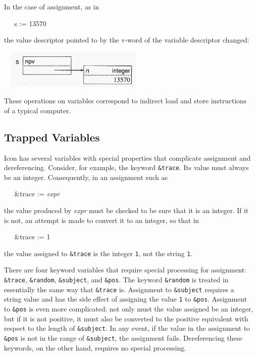 In the case of assignment, as in

{\ttfamily\mdseries
\ \ \ s := 13570}

\noindent the value descriptor pointed to by the v-word of the
variable descriptor changed:

\ \  \includegraphics[width=2.6717in,height=0.7374in]{ib-img/ib-img016.jpg} 

These operations on variables correspond to indirect load and store
instructions of a typical computer.

\subsection{Trapped Variables}

Icon has several variables with special properties that complicate
assignment and dereferencing. Consider, for example, the keyword
\texttt{\&trace}. Its value must always be an integer. Consequently,
in an assignment such as

{\ttfamily\mdseries
\ \ \ \&trace := \textit{expr}}

\noindent the value produced by \textit{expr} must be checked to be
sure that it is an integer. If it is not, an attempt is made to
convert it to an integer, so that in

{\ttfamily\mdseries
\ \ \ \&trace := {\textquotedbl}1{\textquotedbl}}

\noindent the value assigned to \texttt{\&trace} is the integer
\texttt{1}, not the string \texttt{{\textquotedbl}1{\textquotedbl}}.

There are four keyword variables that require special processing for
assignment: \texttt{\&trace}, \texttt{\&random}, \texttt{\&subject},
and \texttt{\&pos}. The keyword \texttt{\&random} is treated in
essentially the same way that \texttt{\&trace} is. Assignment to
\texttt{\&subject} requires a string value and has the side effect of
assigning the value \texttt{1} to \texttt{\&pos}. Assignment to
\texttt{\&pos} is even more complicated: not only must the value
assigned be an integer, but if it is not positive, it must also be
converted to the positive equivalent with respect to the length of
\texttt{\&subject}. In any event, if the value in the assignment to
\texttt{\&pos} is not in the range of \texttt{\&subject}, the
assignment fails. Dereferencing these keywords, on the other hand,
requires no special processing.

